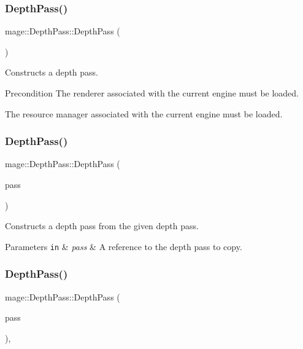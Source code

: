 \subsubsection{\texorpdfstring{Depth\+Pass()}{DepthPass()}\hspace{0.1cm}{\footnotesize\ttfamily [1/3]}}
{\footnotesize\ttfamily mage\+::\+Depth\+Pass\+::\+Depth\+Pass (\begin{DoxyParamCaption}{ }\end{DoxyParamCaption})}

Constructs a depth pass.

\begin{DoxyPrecond}{Precondition}
The renderer associated with the current engine must be loaded. 

The resource manager associated with the current engine must be loaded. 
\end{DoxyPrecond}
\hypertarget{classmage_1_1_depth_pass_a81dfc5bd3e75b19252168313633e678f}{}\label{classmage_1_1_depth_pass_a81dfc5bd3e75b19252168313633e678f} 
\subsubsection{\texorpdfstring{Depth\+Pass()}{DepthPass()}\hspace{0.1cm}{\footnotesize\ttfamily [2/3]}}
{\footnotesize\ttfamily mage\+::\+Depth\+Pass\+::\+Depth\+Pass (\begin{DoxyParamCaption}\item[{const \hyperlink{classmage_1_1_depth_pass}{Depth\+Pass} \&}]{pass }\end{DoxyParamCaption})\hspace{0.3cm}{\ttfamily [delete]}}

Constructs a depth pass from the given depth pass.


\begin{DoxyParams}[1]{Parameters}
\mbox{\tt in}  & {\em pass} & A reference to the depth pass to copy. \\
\hline
\end{DoxyParams}
\hypertarget{classmage_1_1_depth_pass_a3565dc305ec3c71f369187d12c258b15}{}\label{classmage_1_1_depth_pass_a3565dc305ec3c71f369187d12c258b15} 
\subsubsection{\texorpdfstring{Depth\+Pass()}{DepthPass()}\hspace{0.1cm}{\footnotesize\ttfamily [3/3]}}
{\footnotesize\ttfamily mage\+::\+Depth\+Pass\+::\+Depth\+Pass (\begin{DoxyParamCaption}\item[{\hyperlink{classmage_1_1_depth_pass}{Depth\+Pass} \&\&}]{pass }\end{DoxyParamCaption})\hspace{0.3cm}{\ttfamily [default]}, {\ttfamily [noexcept]}}

